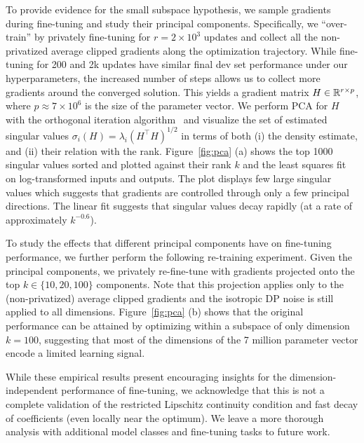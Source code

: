 To provide evidence for the small subspace hypothesis, we sample gradients during fine-tuning and study their principal components.
Specifically, we ``over-train'' by privately fine-tuning for $r = 2 \times 10^3$ updates and collect all the non-privatized average clipped gradients along the optimization trajectory.
While fine-tuning for 200 and 2k updates have similar final dev set performance under our hyperparameters, the increased number of steps allows us to collect more gradients around the converged solution. 
This yields a gradient matrix $H \in \mathbb{R}^{r \times p}$, where $p \approx 7 \times 10^6$ is the size of the parameter vector. 
We perform PCA for $H$ with the orthogonal iteration algorithm~\cite{demmel1997applied} and visualize the set of estimated singular values $\sigma_i(H) = \lambda_i(H^\top H)^{1/2}$ in terms of both (i) the density estimate, and (ii) their relation with the rank.
Figure~\ref{fig:pca} (a) shows the top 1000 singular values sorted and plotted against their rank $k$ and the least squares fit on log-transformed inputs and outputs.
The plot displays few large singular values which suggests that gradients are controlled through only a few principal directions.
The linear fit suggests that singular values decay rapidly (at a rate of approximately $k^{-0.6}$).

To study the effects that different principal components have on fine-tuning performance, we further perform the following re-training experiment. 
Given the principal components, we privately re-fine-tune with gradients projected onto the top $k \in \{10, 20, 100\}$ components.
Note that this projection applies only to the (non-privatized) average clipped gradients and the isotropic DP noise is still applied to all dimensions.
Figure~\ref{fig:pca} (b) shows that the original performance can be attained by optimizing within a subspace of only dimension $k=100$, suggesting that most of the dimensions of the 7 million parameter vector encode a limited learning signal.

While these empirical results present encouraging insights for the dimension-independent performance of fine-tuning, we acknowledge that this is not a complete validation of the restricted Lipschitz continuity condition and fast decay of coefficients (even locally near the optimum).
We leave a more thorough analysis with additional model classes and fine-tuning tasks to future work.

